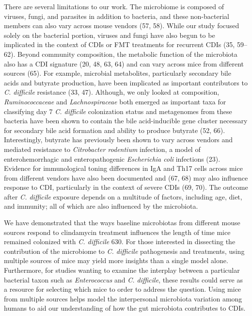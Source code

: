 \documentclass[11pt,]{article}
\begin{document}
There are several limitations to our work. The microbiome is composed of
viruses, fungi, and parasites in addition to bacteria, and these
non-bacterial members can also vary across mouse vendors (57, 58). While
our study focused solely on the bacterial portion, viruses and fungi
have also begun to be implicated in the context of CDIs or FMT
treatments for recurrent CDIs (35, 59--62). Beyond community
composition, the metabolic function of the microbiota also has a CDI
signature (20, 48, 63, 64) and can vary across mice from different
sources (65). For example, microbial metabolites, particularly secondary
bile acids and butyrate production, have been implicated as important
contributors to \emph{C. difficile} resistance (33, 47). Although, we
only looked at composition, \emph{Ruminococcaceae} and
\emph{Lachnospiraceae} both emerged as important taxa for classifying
day 7 \emph{C. difficile} colonization status and metagenomes from these
bacteria have been shown to contain the bile acid-inducible gene cluster
necessary for secondary bile acid formation and ability to produce
butyrate (52, 66). Interestingly, butyrate has previously been shown to
vary across vendors and mediated resistance to \emph{Citrobacter
rodentium} infection, a model of enterohemorrhagic and enteropathogenic
\emph{Escherichia coli} infections (23). Evidence for immunological
toning differences in IgA and Th17 cells across mice from different
vendors have also been documented and (67, 68) may also influence
response to CDI, particularly in the context of severe CDIs (69, 70).
The outcome after \emph{C. difficile} exposure depends on a multitude of
factors, including age, diet, and immunity; all of which are also
influenced by the microbiota.

We have demonstrated that the ways baseline microbiotas from different
mouse sources respond to clindamycin treatment influences the length of
time mice remained colonized with \emph{C. difficile} 630. For those
interested in dissecting the contribution of the microbiome to \emph{C.
difficile} pathogenesis and treatments, using multiple sources of mice
may yield more insights than a single model alone. Furthermore, for
studies wanting to examine the interplay between a particular bacterial
taxon such as \emph{Enterococcus} and \emph{C. difficile}, these results
could serve as a resource for selecting which mice to order to address
the question. Using mice from multiple sources helps model the
interpersonal microbiota variation among humans to aid our understanding
of how the gut microbiota contributes to CDIs.
\end{document}
